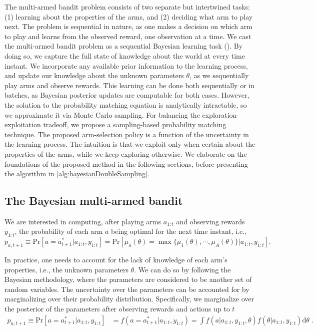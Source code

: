 \documentclass{article}
\newcommand{\ie}{i.e., }
\begin{document}
The multi-armed bandit problem consists of two separate but intertwined tasks: (1) learning about the properties of the arms, and (2) deciding what arm to play next. The problem is sequential in nature, as one makes a decision on which arm to play and learns from the observed reward, one observation at a time. We cast the multi-armed bandit problem as a sequential Bayesian learning task (\cite{b-Bernardo2009}). By doing so, we capture the full state of knowledge about the world at every time instant. We incorporate any available prior information to the learning process, and update our knowledge about the unknown parameters $\theta$, as we sequentially play arms and observe rewards. This learning can be done both sequentially or in batches, as Bayesian posterior updates are computable for both cases. However, the solution to the probability matching equation is analytically intractable, so we approximate it via Monte Carlo sampling. For balancing the exploration-exploitation tradeoff, we propose a sampling-based probability matching technique. 
The proposed arm-selection policy is a function of the uncertainty in the learning process. The intuition is that we exploit only when certain about the properties of the arms, while we keep exploring otherwise. We elaborate on the foundations of the proposed method in the following sections, before presenting the algorithm in \autoref{alg:bayesianDoubleSampling}.

\subsection{The Bayesian multi-armed bandit}
\label{ssec:bayesian_multi_armed_bandit}

We are interested in computing, after playing arms $a_{1:t}$ and observing rewards $y_{1:t}$, the probability of each arm $a$ being optimal for the next time instant, \ie
\begin{equation}
p_{a,t+1} \equiv \mathrm{Pr}\left[a=a_{t+1}^* \big| a_{1:t}, y_{1:t}\right]=\mathrm{Pr}\left[ \mu_{a}(\theta) = \max\{\mu_1(\theta), \cdots, \mu_A(\theta)\} \big| a_{1:t}, y_{1:t}\right] .
\end{equation}

In practice, one needs to account for the lack of knowledge of each arm's properties, \ie the unknown parameters $\theta$. We can do so by following the Bayesian methodology, where the parameters are considered to be another set of random variables. The uncertainty over the parameters can be accounted for by marginalizing over their probability distribution. Specifically, we marginalize over the posterior of the parameters after observing rewards and actions up to $t$
\begin{equation}
\begin{split}
p_{a,t+1} \equiv \mathrm{Pr}\left[a=a_{t+1}^* \big| a_{1:t}, y_{1:t}\right]&=f(a=a^*_{t+1}|a_{1:t}, y_{1:t}) =\int f(a|a_{1:t}, y_{1:t}, \theta) f(\theta|a_{1:t}, y_{1:t}) \mathrm{d}\theta \;.
\end{split}
\label{eq:pr_arm_optimal_bayes}
\end{equation}
\end{document}
